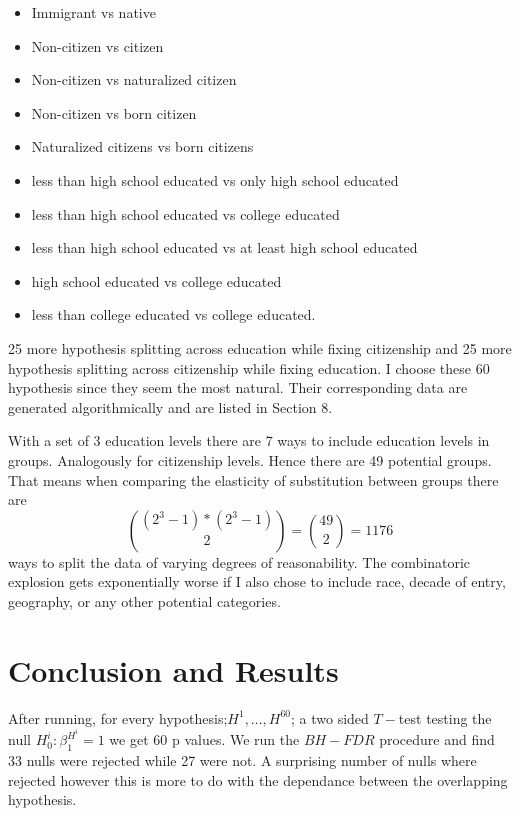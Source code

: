 \documentclass[11pt]{article}
\theoremstyle{definition}
\theoremstyle{remark}
\def\b{\beta}
\begin{document}
\begin{itemize}
    \item Immigrant vs native
    \item Non-citizen vs citizen
    \item Non-citizen vs naturalized citizen
    \item Non-citizen vs born citizen
    \item Naturalized citizens vs born citizens
    \item less than high school educated vs only high school educated
    \item less than high school educated vs college educated
    \item less than high school educated vs at least high school educated
    \item high school educated vs college educated
    \item less than college educated vs college educated.
\end{itemize}

25 more hypothesis splitting across education while fixing citizenship
and 25 more hypothesis splitting across citizenship while fixing education.
I choose these 60 hypothesis since they seem the most natural. Their corresponding
data are generated algorithmically and are listed in Section 8.

With a set of 3 education levels there are 7 ways to include education levels
in groups. Analogously for citizenship levels. Hence there are 49 potential groups.
That means when comparing the elasticity of substitution between groups there are
$${(2^3-1) * (2^3-1) \choose 2} = {49\choose 2} = 1176$$
ways to split the data
of varying degrees of reasonability. The combinatoric explosion gets exponentially
worse if I also chose to include race, decade of entry, geography, or any other
potential categories.


\section{Conclusion and Results}

After running, for every hypothesis;$H^1,...,H^{60}$; a two sided $T-$test testing
the null $H_0^i:\b^{H^i}_1 = 1$ we get 60 p values. We run the $BH-FDR$ procedure
and find 33 nulls were rejected while 27 were not. A surprising number of nulls
where rejected however this is more to do with the dependance between the
overlapping hypothesis.
\end{document}
